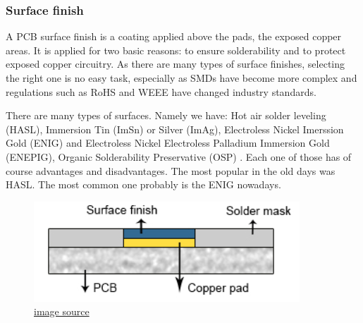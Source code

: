 \documentclass[final]{cubedoc}
\begin{document}
	
	
	
	\subsubsection{Surface finish}
	
	
	A PCB surface finish is a coating applied above the pads, the exposed copper areas. It is applied for two basic reasons: to ensure solderability and to protect exposed copper circuitry. As there are many types of surface finishes, selecting the right one is no easy task, especially as SMDs have become more complex and regulations such as RoHS and WEEE have changed industry standards.
	
	There are many types of surfaces. Namely we have: Hot air solder leveling (HASL), Immersion Tin (ImSn) or Silver (ImAg), Electroless Nickel Imerssion Gold (ENIG) and Electroless Nickel Electroless Palladium Immersion Gold (ENEPIG), Organic Solderability Preservative (OSP) \cite{pcbway:finsih}. Each one of those has of course advantages and disadvantages. The most popular in the old days was HASL.
	The most common one probably is the ENIG nowadays.
	
	
	\begin{figure}[h!]
		\centering
		\includegraphics[keepaspectratio, height=0.2\textheight, width=.6\textwidth]{assets/surface_finish.png}
		\caption{\href{https://web.archive.org/web/20200814090855/https://www.pcbcart.com/article/content/surface-finish-intro-and-comparision.html}{image source}}
	\end{figure}
	
\end{document}
